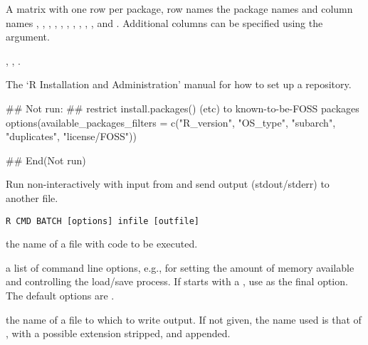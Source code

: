 %
\begin{Value}
A matrix with one row per package, row names the package names and
column names , , ,
, , ,
, , ,
,  and .  Additional
columns can be specified using the  argument.
\end{Value}
%
\begin{SeeAlso}\relax
{}, ,
.

The `R Installation and Administration' manual for how to 
set up a repository.
\end{SeeAlso}
%
\begin{Examples}
\begin{ExampleCode}
## Not run: 
## restrict install.packages() (etc) to known-to-be-FOSS packages
options(available_packages_filters =
  c("R_version", "OS_type", "subarch", "duplicates", "license/FOSS"))


## End(Not run)
\end{ExampleCode}
\end{Examples}
%
\begin{Description}\relax
Run \R{} non-interactively with input from  and
send output (stdout/stderr) to another file.
\end{Description}
%
\begin{Usage}
\begin{verbatim}
R CMD BATCH [options] infile [outfile]
\end{verbatim}
\end{Usage}
%
\begin{Arguments}
\begin{ldescription}
\item[\code{infile}] the name of a file with \R{} code to be executed.
\item[\code{options}] a list of \R{} command line options, e.g., for setting the
amount of memory available and controlling the load/save process.
If  starts with a \samp{-}, use \option{--} as the final
option.
The default options are .
\item[\code{outfile}] the name of a file to which to write output.  If not
given, the name used is that of , with a possible
 extension stripped, and  appended.
\end{ldescription}
\end{Arguments}
